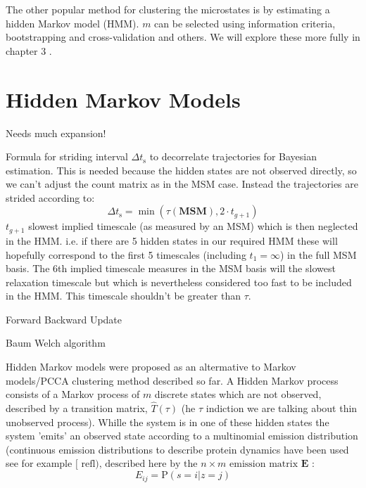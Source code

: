 The other popular method for clustering the microstates is by estimating a hidden Markov model (HMM). $m$ can be selected using information criteria, bootstrapping and cross-validation and others. We will explore these more fully in chapter 3 .

\section{Hidden Markov Models}\label{sec:theory_hmm}

Needs much expansion!

Formula for striding interval $\Delta t_{\mathrm{s}}$ to decorrelate trajectories for Bayesian estimation. This is needed because the hidden states are not observed directly, so we can't adjust the count matrix as in the MSM case. Instead the trajectories are strided according to: 
\begin{equation}\label{eqn:hmm_striding}
    \Delta t_{\mathrm{s}} = \min{\left(\tau(\mathbf{MSM}), 2\cdot t_{g+1}\right)}
\end{equation}
$t_{g+1}$ slowest implied timescale (as measured by an MSM) which is then neglected in the HMM. i.e. if there are 5 hidden states in our required HMM these will hopefully correspond to the first 5 timescales (including $t_{1}=\infty$) in the full MSM basis. The 6th implied timescale measures in the MSM basis will the slowest relaxation timescale but which is nevertheless considered too fast to be included in the HMM. This timescale shouldn't be greater than $\tau$. 

\begin{algorithm}\label{alg:baum_welch}
Forward
Backward
Update
\caption{Baum Welch algorithm}
\end{algorithm}


Hidden Markov models were proposed as an altermative to Markov models/PCCA clustering method described so far. A Hidden Markov process consists of a Markov process of $m$ discrete states which are not observed, described by a transition matrix, $\widehat{T}(\tau)$ (he $\tau$ indiction we are talking about thin unobserved process). Whille the system is in one of these hidden states the system 'emits' an observed state according to a multinomial emission distribution (continuous emission distributions to describe protein dynamics have been used see for example $[\text { refl), described here by the } n \times m \text { emission matrix } \mathbf{E}$ :
\begin{equation}
E_{i j}=\mathrm{P}(s=i | z=j)
\end{equation}

